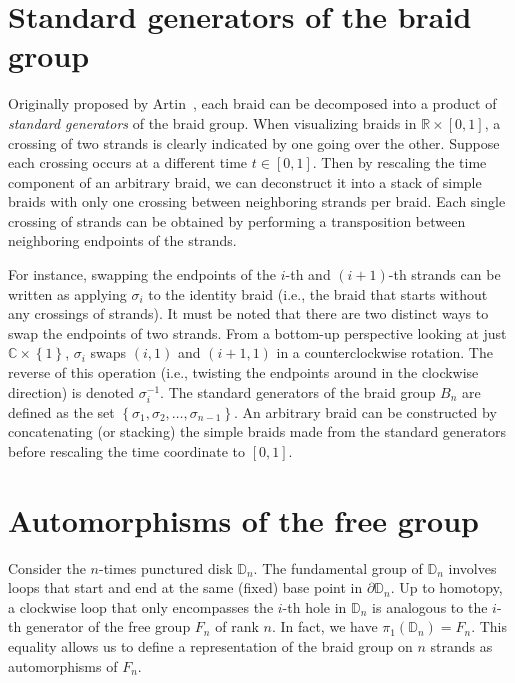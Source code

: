 \documentclass[12pt]{report}
\newcommand{\C}{\mathbb{C}}
\newcommand{\R}{\mathbb{R}}
\newcommand{\D}{\mathbb{D}}
\theoremstyle{definition}
\begin{document}
\section{Standard generators of the braid group}\label{sec:std_gens}
Originally proposed by Artin~\cite{Artin1947}, each braid can be decomposed into a product of \textit{standard generators} of the braid group. When visualizing braids in $\R\times[0,1]$, a crossing of two strands is clearly indicated by one going over the other. Suppose each crossing occurs at a different time $t\in[0,1]$. Then by rescaling the time component of an arbitrary braid, we can deconstruct it into a stack of simple braids with only one crossing between neighboring strands per braid. Each single crossing of strands can be obtained by performing a transposition between neighboring endpoints of the strands.

For instance, swapping the endpoints of the $i$-th and $(i+1)$-th strands can be written as applying $\sigma_i$ to the identity braid (i.e., the braid that starts without any crossings of strands). It must be noted that there are two distinct ways to swap the endpoints of two strands. From a bottom-up perspective looking at just $\C\times\left\{ 1 \right\}$, $\sigma_i$ swaps $(i,1)$ and $(i+1,1)$ in a counterclockwise rotation. The reverse of this operation (i.e., twisting the endpoints around in the clockwise direction) is denoted $\sigma_i^{-1}$. The standard generators of the braid group $B_n$ are defined as the set $\left\{ \sigma_1,\sigma_2,\dots,\sigma_{n-1} \right\}$. An arbitrary braid can be constructed by concatenating (or stacking) the simple braids made from the standard generators before rescaling the time coordinate to $[0,1]$.

\section{Automorphisms of the free group}

Consider the $n$-times punctured disk $\D_n$. The fundamental group of $\D_n$ involves loops that start and end at the same (fixed) base point in $\partial\D_n$. Up to homotopy, a clockwise loop that only encompasses the $i$-th hole in $\D_n$ is analogous to the $i$-th generator of the free group $F_n$ of rank $n$. In fact, we have $\pi_1\left( \D_n \right) = F_n$. This equality allows us to define a representation of the braid group on $n$ strands as automorphisms of $F_n$.
\end{document}
